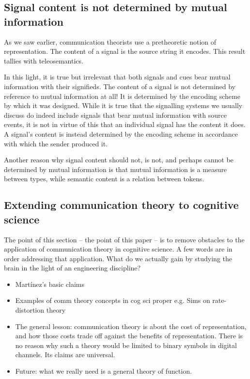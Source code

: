 \subsection{Signal content is not determined by mutual information}

As we saw earlier, communication theorists use a pretheoretic notion of representation.
The content of a signal is the source string it encodes.
This result tallies with teleosemantics.

In this light, it is true but irrelevant that both signals and cues bear mutual information with their signifieds. 
The content of a signal is not determined by reference to mutual information at all!
It is determined by the encoding scheme by which it was designed.
While it is true that the signalling systems we usually discuss do indeed include signals that bear mutual information with source events, it is not in virtue of this that an individual signal has the content it does.
A signal's content is instead determined by the encoding scheme in accordance with which the sender produced it.

Another reason why signal content should not, is not, and perhaps cannot be determined by mutual information is that mutual information is a measure between types, while semantic content is a relation between tokens.



\subsection{Extending communication theory to cognitive science}

The point of this section -- the point of this paper -- is to remove obstacles to the application of communication theory in cognitive science.
A few words are in order addressing that application.
What do we actually gain by studying the brain in the light of an engineering discipline?

\begin{itemize}
    \item Mart\'{i}nez's basic claims
    \item Examples of comm theory concepts in cog sci proper e.g. Sims on rate-distortion theory
    \item The general lesson: communication theory is about the cost of representation, and how those costs trade off against the benefits of representation. There is no reason why such a theory would be limited to binary symbols in digital channels. Its claims are universal.
    \item Future: what we really need is a general theory of function.
\end{itemize}
